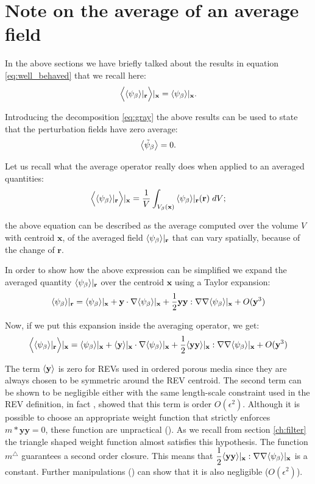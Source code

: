 \section{Note on the average of an average field}
\label{ch:appendix_a}

In the above sections we have briefly talked about the results in equation \eqref{eq:well_behaved} that we recall here:
$$\Big<{\left< \psi_{\beta} \right>}|_{\mathbf{r}} \Big>|_{\mathbf{x}} = {\left< \psi_{\beta} \right>}|_{\mathbf{x}}.$$

\noindent Introducing the decomposition \eqref{eq:gray} the above results can be used to state that the perturbation fields have zero average:
$$  {\left< \tilde{\psi}_{\beta} \right>} = 0.$$

\noindent Let us recall what the average operator really does when applied to an averaged quantities:
$$  \Big< {\left< \psi_{\beta} \right>}|_{\mathbf{r}} \Big>|_{\mathbf{x}}  = \dfrac{1}{V} \int_{V_\beta(\mathbf{x})} {\left< \psi_{\beta} \right>}|_{\mathbf{r}}(\mathbf{r}) \; dV; $$

\noindent the above equation can be described as the average computed over the volume $V$ with centroid $\mathbf{x}$, of the averaged field ${\left< \psi_{\beta} \right>}|_{\mathbf{r}}$ that can vary spatially, because of the change of $\mathbf{r}$.

In order to show how the above expression can be simplified we expand the averaged quantity ${\left< \psi_{\beta} \right>}|_{\mathbf{r}}$ over the centroid $\mathbf{x}$ using a Taylor expansion:
$$
{\left< \psi_{\beta} \right>}|_{\mathbf{r}} = {\left< \psi_{\beta} \right>}|_{\mathbf{x}} + \mathbf{y} \cdot \nabla {\left< \psi_{\beta} \right>}|_{\mathbf{x}} + \dfrac{1}{2} \mathbf{y}\mathbf{y} :  \nabla \nabla {\left< \psi_{\beta} \right>}|_{\mathbf{x}} + O(\mathbf{y}^3)
$$

Now, if we put this expansion inside the averaging operator, we get:
$$
\Big< {\left< \psi_{\beta} \right>}|_{\mathbf{r}} \Big>|_{\mathbf{x}} = {\left< \psi_{\beta} \right>}|_{\mathbf{x}} + {\left< \mathbf{y} \right>}|_{\mathbf{x}} \cdot \nabla {\left< \psi_{\beta} \right>}|_{\mathbf{x}} + \dfrac{1}{2} {\left< \mathbf{y}\mathbf{y} \right>}|_{\mathbf{x}} :  \nabla \nabla {\left< \psi_{\beta} \right>}|_{\mathbf{x}} + O(\mathbf{y}^3)
$$

The term ${\left< \mathbf{y} \right>}$ is zero for REVs used in ordered porous media since they are always chosen to be symmetric around the REV centroid.
The second term can be shown to be negligible either with the same length-scale constraint used in the REV definition, in fact \citet{ochoa1995momentum}, \citet{paez2017macroscopic} showed that this term is order $O(\epsilon^2)$.
Although it is possible to choose an appropriate weight function that strictly enforces $m*\mathbf{y}\mathbf{y} =0$, these function are unpractical (\citet{davit2017technical}).
As we recall from section \ref{ch:filter} the triangle shaped weight function almost satisfies this hypothesis. The function $m^{\triangle}$ guarantees a second order closure. This means that $\dfrac{1}{2} {\left< \mathbf{y}\mathbf{y} \right>}|_{\mathbf{x}} :  \nabla \nabla {\left< \psi_{\beta} \right>}|_{\mathbf{x}}$ is a constant. Further manipulations (\cite{davit2017technical}) can show that it is also negligible ($O(\epsilon^2)$).

